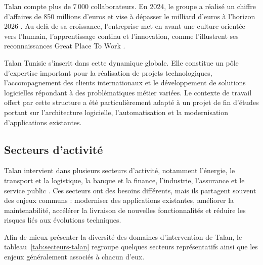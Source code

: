 Talan compte plus de 7\,000 collaborateurs. En 2024, le groupe a réalisé un chiffre d'affaires de 850 millions d'euros et vise à dépasser le milliard d'euros à l'horizon 2026 \cite{talan_org}. Au-delà de sa croissance, l'entreprise met en avant une culture orientée vers l'humain, l'apprentissage continu et l'innovation, comme l'illustrent ses reconnaissances Great Place To Work \cite{gptw_talan}.

Talan Tunisie s'inscrit dans cette dynamique globale. Elle constitue un pôle d'expertise important pour la réalisation de projets technologiques, l'accompagnement des clients internationaux et le développement de solutions logicielles répondant à des problématiques métier variées. Le contexte de travail offert par cette structure a été particulièrement adapté à un projet de fin d'études portant sur l'architecture logicielle, l'automatisation et la modernisation d'applications existantes.

\subsection{Secteurs d'activité}

Talan intervient dans plusieurs secteurs d'activité, notamment l'énergie, le transport et la logistique, la banque et la finance, l'industrie, l'assurance et le service public \cite{talan_secteurs}. Ces secteurs ont des besoins différents, mais ils partagent souvent des enjeux communs : moderniser des applications existantes, améliorer la maintenabilité, accélérer la livraison de nouvelles fonctionnalités et réduire les risques liés aux évolutions techniques.

Afin de mieux présenter la diversité des domaines d'intervention de Talan, le tableau~\ref{tab:secteurs-talan} regroupe quelques secteurs représentatifs ainsi que les enjeux généralement associés à chacun d'eux.

